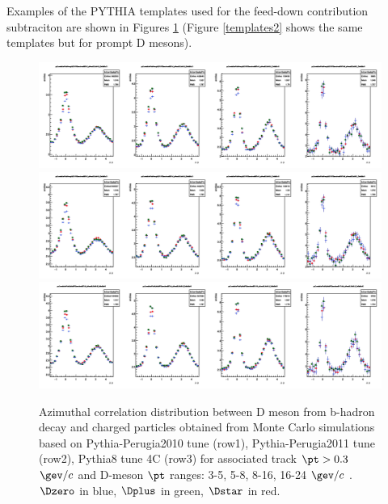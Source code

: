 Examples of the PYTHIA templates used for the feed-down contribution subtraciton are shown in Figures \ref{templates1} (Figure \ref{templates2} shows the same templates but for prompt D mesons).

\begin{figure}
\centering
\includegraphics[width=1\linewidth]{figures/Template/1DCompare_allDpTfromB_AssoPt_0dot3to99dot0GeVc_Perugia2010.png}
\includegraphics[width=1\linewidth]{figures/Template/1DCompare_allDpTfromB_AssoPt_0dot3to99dot0GeVc_Perugia2011.png}
\includegraphics[width=1\linewidth]{figures/Template/1DCompare_allDpTfromB_AssoPt_0dot3to99dot0GeVc_Pythia8.png}
\caption{Azimuthal correlation distribution between D meson from b-hadron decay and charged particles obtained from Monte Carlo simulations
based on Pythia-Perugia2010 tune (row1), Pythia-Perugia2011 tune (row2), Pythia8 tune 4C (row3) for associated track $\pt > 0.3$ $\gev/c$  and D-meson $\pt$ ranges: 3-5, 5-8, 8-16, 16-24 $\gev/c$ . $\Dzero$ in blue, $\Dplus$ in green, $\Dstar$ in red.}
\label{templates1}
\end{figure}

